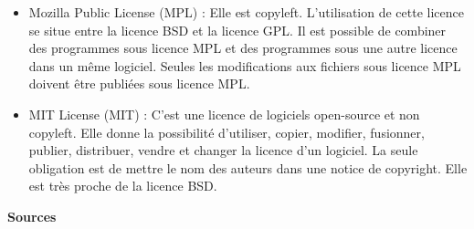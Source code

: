 \documentclass[12pt,a4paper]{article}
\begin{document}
\begin{itemize}
	\vskip3mm	
	\item Mozilla Public License (MPL) : Elle est copyleft. L'utilisation de cette licence se situe entre la licence BSD et la licence GPL. Il est possible de combiner des programmes sous licence MPL et des programmes sous une autre licence dans un m\^{e}me logiciel. Seules les modifications aux fichiers sous licence MPL doivent \^{e}tre publiées sous licence MPL.
	\vskip3mm	
	\item MIT License (MIT) : C'est une licence de logiciels open-source et non copyleft. Elle donne la possibilité d'utiliser, copier, modifier, fusionner, publier, distribuer, vendre et changer la licence d'un logiciel. La seule obligation est de mettre le nom des auteurs dans une notice de copyright. Elle est très proche de la licence BSD.
	
\end{itemize}

\vskip2cm
\Large\textbf{ Sources}
\end{document}
